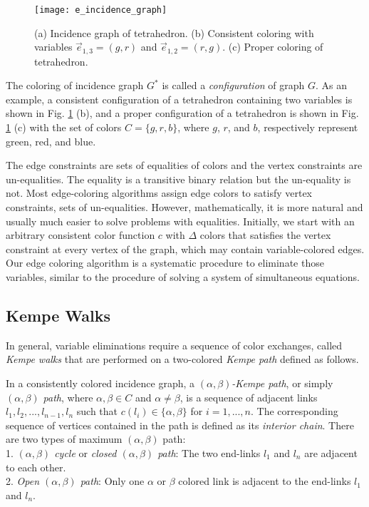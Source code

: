 \documentclass[11pt]{article}
\newenvironment{definition}[1][Definition]{\begin{trivlist}
\item[\hskip \labelsep {\bfseries #1}]}{\end{trivlist}}
\begin{document}
\begin{figure}[htpb]
	\centering
	\texttt{[image: e\_incidence\_graph]}
	\caption{(a) Incidence graph of tetrahedron. (b) Consistent coloring with variables $\vec{e}_{1,3}=(g,r)$ and $\vec{e}_{1,2}=(r,g)$. (c) Proper coloring of tetrahedron.}
	\label{fig:incidencetetrahedron}
\end{figure}

The coloring of incidence graph $G^*$ is called a {\it configuration} of graph $G$. As an example, a consistent configuration of a tetrahedron containing two variables is shown in Fig. \ref{fig:incidencetetrahedron} (b), and a proper configuration of a tetrahedron is shown in Fig. \ref{fig:incidencetetrahedron} (c) with the set of colors $C=\{g,r,b\}$, where $g$, $r$, and $b$, respectively represent green, red, and blue.


The edge constraints are sets of equalities of colors and the vertex constraints are un-equalities. The equality is a transitive binary relation but the un-equality is not. Most edge-coloring algorithms assign edge colors to satisfy vertex constraints, sets of un-equalities. However, mathematically, it is more natural and usually much easier to solve problems with equalities. Initially, we start with an arbitrary consistent color function $c$ with $\Delta$ colors that satisfies the vertex constraint at every vertex of the graph, which may contain variable-colored edges. Our edge coloring algorithm is a systematic procedure to eliminate those variables, similar to the procedure of solving a system of simultaneous equations. 


\subsection{Kempe Walks}
In general, variable eliminations require a sequence of color exchanges, called {\it Kempe walks} that are performed on a two-colored {\it Kempe path} defined as follows.


\begin{definition}
\label{definition:KempePath}
In a consistently colored incidence graph, a {\it $(\alpha,\beta)$-Kempe path}, or simply {\it $(\alpha,\beta)$ path}, where $\alpha,\beta \in C$ and $\alpha \neq \beta $, is a sequence of adjacent links $l_1,l_2,...,l_{n-1},l_n$ such that $c(l_i)\in \{\alpha,\beta\}$ for $i=1,...,n$. The corresponding sequence of vertices contained in the path is defined as its {\it interior chain}. There are two types of maximum $(\alpha,\beta)$ path:\\
1. {\it $(\alpha,\beta)$ cycle} or {\it closed $(\alpha,\beta)$ path}: The two end-links $l_1$ and $l_n$ are adjacent to each other.\\
2. {\it Open $(\alpha,\beta)$ path}: Only one $\alpha$ or $\beta$ colored link is adjacent to the end-links $l_1$  and $l_n$.
\end{definition}
\end{document}
